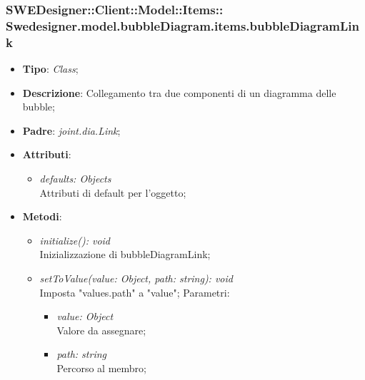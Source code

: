 \documentclass[../DefinizioneDiProdotto.tex]{subfiles}
\begin{document}
			\subsubsection[Swedesigner.model.bubbleDiagram.items.bubbleDiagramLink]{SWEDesigner::Client::Model::Items::\\Swedesigner.model.bubbleDiagram.items.bubbleDiagramLink}
			\hypertarget{SWEDesigner::Client::Model::Items::Swedesigner.model.bubbleDiagram.items.bubbleDiagramLink}{}
			\begin{itemize}
				\item \textbf{Tipo}: \emph{Class};
				\item \textbf{Descrizione}: Collegamento tra due componenti di un diagramma delle bubble;
				\item \textbf{Padre}: \emph{joint.dia.Link};
				\item \textbf{Attributi}:
				\begin{itemize}
					\item \emph{defaults: Objects}\\
					Attributi di default per l'oggetto;
				\end{itemize}
				\item \textbf{Metodi}:
				\begin{itemize}
					\item \emph{initialize(): void}\\
					Inizializzazione di bubbleDiagramLink;
					\item \emph{setToValue(value: Object, path: string): void}\\
					Imposta "values.path" a "value";
					Parametri:
					\begin{itemize}
						\item \emph{value: Object} \\
						Valore da assegnare;
						\item \emph{path: string} \\
						Percorso al membro;
					\end{itemize}
				\end{itemize}
			\end{itemize}
			
\end{document}
